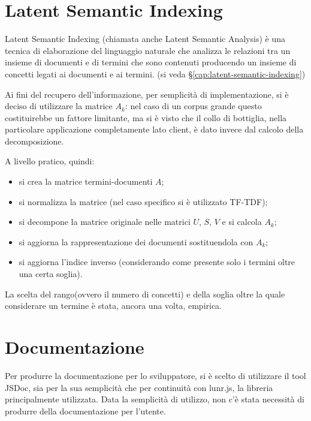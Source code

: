 \section{Latent Semantic Indexing}
Latent Semantic Indexing (chiamata anche Latent Semantic Analysis) è una tecnica di elaborazione del linguaggio naturale che analizza le relazioni tra un insieme di documenti e di termini che sono contenuti producendo un insieme di concetti legati ai documenti e ai termini. (si veda §\ref{cap:latent-semantic-indexing})

Ai fini del recupero dell'informazione, per semplicità di implementazione, si è deciso di utilizzare la matrice $A_k$: nel caso di un corpus grande questo costituirebbe un fattore limitante, ma si è visto che il collo di bottiglia, nella particolare applicazione completamente lato client, è dato invece dal calcolo della decomposizione.

A livello pratico, quindi:
\begin{itemize}
    \item si crea la matrice termini-documenti $A$;
    \item si normalizza la matrice (nel caso specifico si è utilizzato TF-TDF);
    \item si decompone la matrice originale nelle matrici $U$, $S$, $V$ e si calcola $A_k$;
    \item si aggiorna la rappresentazione dei documenti sostituendola con $A_k$;
    \item si aggiorna l'indice inverso (considerando come presente solo i termini oltre una certa soglia).    
\end{itemize}

La scelta del rango(ovvero il numero di concetti) e della soglia oltre la quale considerare un termine è stata, ancora una volta, empirica.

\section{Documentazione}
Per produrre la documentazione per lo sviluppatore, si è scelto di utilizzare il tool JSDoc, sia per la sua semplicità che per continuità con lunr.js, la libreria principalmente utilizzata. Data la semplicità di utilizzo, non c'è stata necessità di produrre della documentazione per l'utente.